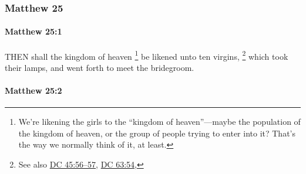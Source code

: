 	\subsubsection{Matthew 25} %
		\label{MATTHEW-25}
		
		\paragraph{Matthew 25:1} %
			\label{MATTHEW-25-1}

			THEN shall the kingdom of heaven%
				\footnote{%
					We're likening the girls to the ``kingdom of heaven''---maybe the population of the kingdom of heaven, or the group of people trying to enter into it? That's the way we normally think of it, at least.
					} 
			be likened unto ten virgins,%
				\footnote{%
					See also \hyperref[DC45-56]{DC 45:56--57}, \hyperref[DC63-54]{DC 63:54}, 
					} 
			which took their lamps, and went forth to meet the bridegroom.

			\begin{framed}
			\scriptsize
				\begin{compactdesc}
					\item[SBLG] 
				\end{compactdesc}
			\end{framed}

		\paragraph{Matthew 25:2} %
			\label{MATTHEW-25-2}

